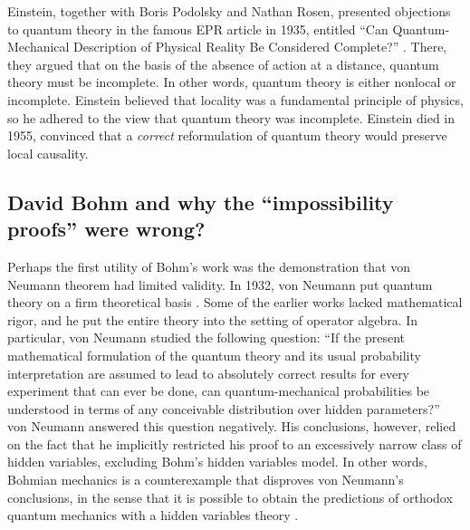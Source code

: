 \documentclass[onecolumn,nofootinbib, secnumarabic, amsmath, nobibnotes,12pt,aps,pra]{revtex4-1}
\begin{document}
Einstein, together with Boris Podolsky and Nathan Rosen, presented
objections to quantum theory in the famous EPR article in 1935,
entitled ``Can Quantum-Mechanical Description of Physical Reality Be
Considered Complete?'' \cite{om.Einstein_rosen1935}. There, they
argued that on the basis of the absence of action at a distance,
quantum theory must be incomplete. In other words, quantum theory is
either nonlocal or incomplete. Einstein believed that locality was a
fundamental principle of physics, so he adhered to the view that
quantum theory was incomplete. Einstein died in 1955, convinced that
a \textit{correct} reformulation of quantum theory would preserve
local causality.


\subsection{David Bohm and why the ``impossibility proofs'' were wrong?}\label{om.sec_intro.7}

Perhaps the first utility of Bohm's work was the demonstration that von Neumann theorem had limited validity. In 1932, von Neumann put quantum theory on a firm theoretical basis \cite{om.impossibility_proofs}. Some of the earlier works lacked mathematical rigor, and he put the entire theory into the setting of operator algebra. In particular,  von Neumann studied the following question: ``If the present mathematical formulation of the quantum theory and its usual probability interpretation are assumed to lead to absolutely correct results for every experiment that can ever be done, can quantum-mechanical probabilities be understood in terms of any conceivable distribution over hidden parameters?'' von Neumann answered this question negatively.
His conclusions, however, relied on the fact that he implicitly restricted his proof to an excessively narrow class of hidden variables, excluding Bohm's hidden variables model.
In other words, Bohmian mechanics is a counterexample that disproves von Neumann's conclusions, in the sense that it is possible to obtain the predictions of orthodox quantum mechanics with a hidden variables theory \cite{om.Holand1993,om.Bell1987}.
\end{document}
